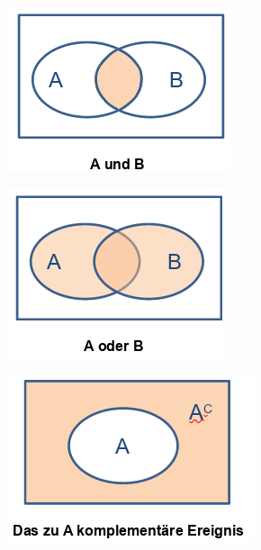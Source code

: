 \documentclass[11pt,twoside,landscape]{article}
\begin{document}
\begin{multicols}{3}
\begin{center}
\includegraphics[width=.9\linewidth]{static/img/exev/w06-wahrscheinlichkeit-and.png}
\end{center}
\begin{center}
\includegraphics[width=.9\linewidth]{static/img/exev/w06-wahrscheinlichkeit-or.png}
\end{center}
\begin{center}
\includegraphics[width=.9\linewidth]{static/img/exev/w06-wahrscheinlichkeit-not.png}

\end{center}
\end{multicols}
\end{document}
